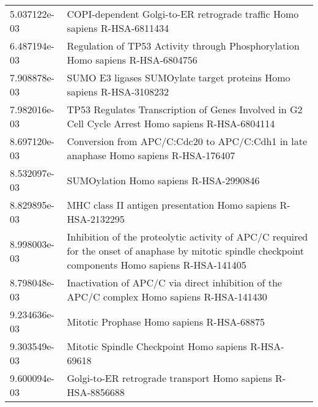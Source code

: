 \begin{longtable}{p{2.4cm}p{14.5cm}}
             5.037122e-03 &                                                                               COPI-dependent Golgi-to-ER retrograde traffic Homo sapiens R-HSA-6811434 \\
             6.487194e-03 &                                                                         Regulation of TP53 Activity through Phosphorylation Homo sapiens R-HSA-6804756 \\
             7.908878e-03 &                                                                                   SUMO E3 ligases SUMOylate target proteins Homo sapiens R-HSA-3108232 \\
             7.982016e-03 &                                                      TP53 Regulates Transcription of Genes Involved in G2 Cell Cycle Arrest Homo sapiens R-HSA-6804114 \\
             8.697120e-03 &                                                                   Conversion from APC/C:Cdc20 to APC/C:Cdh1 in late anaphase Homo sapiens R-HSA-176407 \\
             8.532097e-03 &                                                                                                                 SUMOylation Homo sapiens R-HSA-2990846 \\
             8.829895e-03 &                                                                                           MHC class II antigen presentation Homo sapiens R-HSA-2132295 \\
             8.998003e-03 &  Inhibition of the proteolytic activity of APC/C required for the onset of anaphase by mitotic spindle checkpoint components Homo sapiens R-HSA-141405 \\
             8.798048e-03 &                                                             Inactivation of APC/C via direct inhibition of the APC/C complex Homo sapiens R-HSA-141430 \\
             9.234636e-03 &                                                                                                              Mitotic Prophase Homo sapiens R-HSA-68875 \\
             9.303549e-03 &                                                                                                    Mitotic Spindle Checkpoint Homo sapiens R-HSA-69618 \\
             9.600094e-03 &                                                                                            Golgi-to-ER retrograde transport Homo sapiens R-HSA-8856688 \\

\end{longtable}
